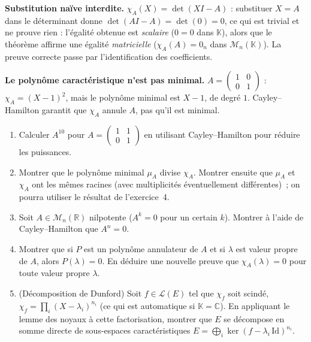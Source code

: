 
\begin{mdframed}[style=cexbar]
  \textbf{Substitution naïve interdite.}\enspace%
  $\chi_A(X) = \det(XI-A)$ : substituer $X=A$ dans le déterminant
  donne $\det(AI-A)=\det(0)=0$, ce qui est trivial et ne prouve rien :
  l'égalité obtenue est \emph{scalaire} ($0=0$ dans $\mathbb{K}$), alors
  que le théorème affirme une égalité \emph{matricielle}
  ($\chi_A(A)=0_n$ dans $\mathcal{M}_n(\mathbb{K})$).
  La preuve correcte passe par l'identification des coefficients.

  \smallskip\noindent
  \textbf{Le polynôme caractéristique n'est pas minimal.}\enspace%
  $A = \begin{pmatrix}1&0\\0&1\end{pmatrix}$ : $\chi_A = {(X-1)}^2$,
  mais le polynôme minimal est $X-1$, de degré $1$. Cayley--Hamilton
  garantit que $\chi_A$ annule $A$, pas qu'il est minimal.
\end{mdframed}

\vspace{6pt}
\exolabel

\begin{mdframed}[style=exobar]
  \begin{enumerate}
    \item Calculer $A^{10}$ pour $A = \begin{pmatrix}1&1\\0&1\end{pmatrix}$
          en utilisant Cayley--Hamilton pour réduire les puissances.

    \item Montrer que le polynôme minimal $\mu_A$
          divise $\chi_A$. Montrer ensuite que $\mu_A$ et $\chi_A$ ont les mêmes
          racines (avec multiplicités éventuellement différentes)~; on pourra
          utiliser le résultat de l'exercice~4.

    \item Soit $A\in\mathcal{M}_n(\mathbb{R})$ nilpotente ($A^k=0$ pour
          un certain $k$). Montrer à l'aide de Cayley--Hamilton que $A^n=0$.

    \item Montrer que si $P$ est un polynôme annulateur de $A$ et si
          $\lambda$ est valeur propre de $A$, alors $P(\lambda)=0$.
          En déduire une nouvelle preuve que $\chi_A(\lambda)=0$ pour
          toute valeur propre $\lambda$.

    \item (Décomposition de Dunford) Soit $f \in \mathcal{L}(E)$ tel que
          $\chi_f$ soit scindé,
          $\chi_f = \prod_i {(X-\lambda_i)}^{n_i}$ (ce qui est automatique
          si $\mathbb{K} = \mathbb{C}$). En appliquant le lemme des noyaux
          à cette factorisation, montrer que $E$ se décompose en somme
          directe de sous-espaces caractéristiques
          $E = \bigoplus_i \ker{(f-\lambda_i\,\mathrm{Id})}^{n_i}$.
  \end{enumerate}
\end{mdframed}

